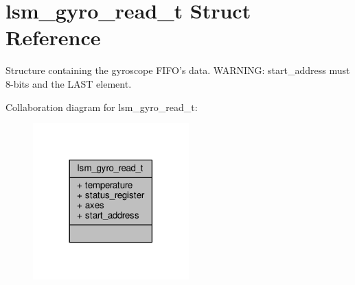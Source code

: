 \hypertarget{structlsm__gyro__read__t}{\section{lsm\+\_\+gyro\+\_\+read\+\_\+t Struct Reference}
\label{structlsm__gyro__read__t}
}


Structure containing the gyroscope F\+I\+F\+O's data. W\+A\+R\+N\+I\+N\+G\+: start\+\_\+address must 8-\/bits and the L\+A\+S\+T element.  




Collaboration diagram for lsm\+\_\+gyro\+\_\+read\+\_\+t\+:
\nopagebreak
\begin{figure}[H]
\begin{center}
\leavevmode
\includegraphics[width=170pt]{structlsm__gyro__read__t__coll__graph}
\end{center}
\end{figure}

